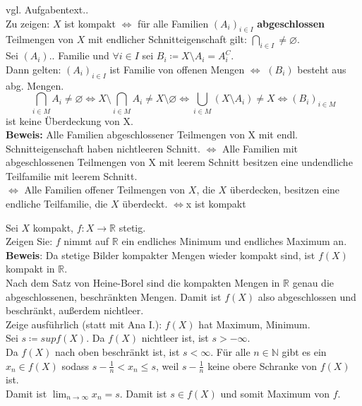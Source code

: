 \begin{problem*}[2]	
vgl. Aufgabentext.. \\
Zu zeigen: $ X $ ist kompakt $ \Longleftrightarrow$ für alle Familien $(A_i)_{ i \in I}$ \textbf{abgeschlossen}
Teilmengen von $ X $ mit endlicher Schnitteigenschaft gilt: $ \bigcap_{ i \in I}  \neq \varnothing$.\\
Sei $ (A_i)..$ Familie und $\forall i \in I$ sei $B_i \coloneqq X \setminus A_i = A_i^{C}$.\\
Dann gelten: 
	$(A_i)_ { i \in I}$ ist Familie von offenen Mengen $\Longleftrightarrow$ $(B_i)$ besteht aus abg. Mengen.
	\begin{equation*}
		\bigcap_{ i \in M} A_i \neq \varnothing \Leftrightarrow X \setminus \bigcap_{ i \in M} A_i \neq	X \setminus \varnothing \Leftrightarrow \bigcup_ {i \in M} (X \setminus A_i) \neq X \Longleftrightarrow (B_i)_{ i \in M }  
	\end{equation*}
	ist keine Überdeckung von X.\\
	\textbf{Beweis: } Alle Familien abgeschlossener Teilmengen von X mit endl. Schnitteigenschaft haben nichtleeren Schnitt. $\Leftrightarrow$ Alle Familien mit abgeschlossenen Teilmengen von X mit leerem Schnitt besitzen eine undendliche Teilfamilie mit leerem Schnitt. \\
	$\Leftrightarrow$ Alle Familien offener Teilmengen von $ X $, die $ X $ überdecken, besitzen eine endliche Teilfamilie, die $ X $ überdeckt. $\Longleftrightarrow $x ist kompakt
\end{problem*}

\begin{problem*}[3]
Sei $ X $ kompakt, $ f: X \to \mathbb{R}$ stetig.\\
Zeigen Sie: $ f $ nimmt auf $ \mathbb{R} $ ein endliches Minimum und endliches Maximum an.\\
\textbf{Beweis}: Da stetige Bilder kompakter Mengen wieder kompakt sind, ist $f(X)$ kompakt in $\mathbb{R}$.\\
Nach dem Satz von Heine-Borel sind die kompakten Mengen in $\mathbb{R}$ genau die abgeschlossenen, beschränkten Mengen. Damit ist $ f(X) $ also abgeschlossen und beschränkt, außerdem nichtleer.\\
Zeige ausführlich (statt mit Ana I.): $ f(X) $ hat Maximum, Minimum.\\
Sei $ s \coloneqq sup f(X)$. Da $ f(X) $ nichtleer ist, ist $ s > - \infty$.\\
Da $ f(X) $ nach oben beschränkt  ist, ist $ s < \infty$.
Für alle $n \in \mathbb{N}$ gibt es ein $x_n \in f(X)$ sodass $s - \frac{1}{n} < x_n \leq s$, weil $s - \frac{1}{n}$ keine obere Schranke von $ f(X) $ ist.\\
Damit ist $\lim_{ n \rightarrow \infty } x_n = s$. Damit ist $s \in f(X) $ und somit Maximum von $ f $.\\
\end{problem*}

